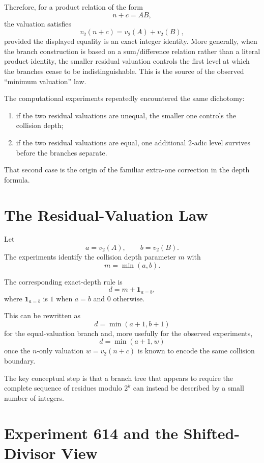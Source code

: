 \documentclass[11pt,a4paper]{article}
\newcommand{\vTwo}{v_2}
\begin{document}
Therefore, for a product relation of the form
\[
    n+c=AB,
\]
the valuation satisfies
\[
    \vTwo(n+c)
    =
    \vTwo(A)+\vTwo(B),
\]
provided the displayed equality is an exact integer identity. More generally, when the branch construction is based on a sum/difference relation rather than a literal product identity, the smaller residual valuation controls the first level at which the branches cease to be indistinguishable. This is the source of the observed ``minimum valuation'' law.

The computational experiments repeatedly encountered the same dichotomy:

\begin{enumerate}[leftmargin=2em]
    \item if the two residual valuations are unequal, the smaller one controls the collision depth;
    \item if the two residual valuations are equal, one additional $2$-adic level survives before the branches separate.
\end{enumerate}

That second case is the origin of the familiar extra-one correction in the depth formula.

\section{The Residual-Valuation Law}

Let
\[
    a=\vTwo(A),
    \qquad
    b=\vTwo(B).
\]
The experiments identify the collision depth parameter $m$ with
\[
    \boxed{m=\min(a,b)}.
\]

The corresponding exact-depth rule is
\[
    \boxed{
    d=m+\mathbf{1}_{a=b}
    },
\]
where $\mathbf{1}_{a=b}$ is $1$ when $a=b$ and $0$ otherwise.

This can be rewritten as
\[
    \boxed{
    d=\min(a+1,b+1)
    }
\]
for the equal-valuation branch and, more usefully for the observed experiments,
\[
    d=\min(a+1,w)
\]
once the $n$-only valuation $w=\vTwo(n+c)$ is known to encode the same collision boundary.

The key conceptual step is that a branch tree that appears to require the complete sequence of residues modulo $2^k$ can instead be described by a small number of integers.

\section{Experiment 614 and the Shifted-Divisor View}
\end{document}

